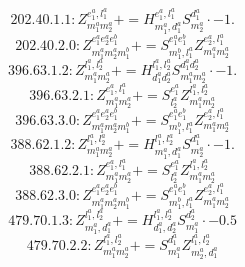 \documentclass[letterpaper,10pt,fleqn,leqno,onecolumn]{article}
\begin{document}
\begin{equation} \;\;\;\;\;\;  202.40.1.1: Z^{e_{1}^{a},l_{1}^{a}}_{m_{1}^{a}m_{2}^{a}}+=H^{e_{1}^{a},l_{1}^{a}}_{m_{1}^{a},d_{1}^{a}}S^{d_{1}^{a}}_{m_{2}^{a}}\cdot -1. \end{equation}
\begin{equation} \;\;\;\;\;\;  202.40.2.0: Z^{e_{1}^{a}e_{2}^{a}e_{1}^{b}}_{m_{1}^{a}m_{2}^{a}m_{1}^{b}}+=S^{e_{1}^{a}e_{1}^{b}}_{m_{1}^{b},l_{1}^{a}}Z^{e_{2}^{a},l_{1}^{a}}_{m_{1}^{a}m_{2}^{a}} \end{equation}
\begin{equation} \;\;\;\;\;\;  396.63.1.2: Z^{l_{1}^{a},l_{2}^{a}}_{m_{1}^{a}m_{2}^{a}}+=H^{l_{1}^{a},l_{2}^{a}}_{d_{1}^{a}d_{2}^{a}}S^{d_{1}^{a}d_{2}^{a}}_{m_{1}^{a}m_{2}^{a}}\cdot -1. \end{equation}
\begin{equation} \;\;\;\;\;\;  396.63.2.1: Z^{e_{1}^{a},l_{1}^{a}}_{m_{1}^{a}m_{2}^{a}}+=S^{e_{1}^{a}}_{l_{2}^{a}}Z^{l_{1}^{a},l_{2}^{a}}_{m_{1}^{a}m_{2}^{a}} \end{equation}
\begin{equation} \;\;\;\;\;\;  396.63.3.0: Z^{e_{1}^{a}e_{2}^{a}e_{1}^{b}}_{m_{1}^{a}m_{2}^{a}m_{1}^{b}}+=S^{e_{1}^{a}e_{1}^{b}}_{m_{1}^{b},l_{1}^{a}}Z^{e_{2}^{a},l_{1}^{a}}_{m_{1}^{a}m_{2}^{a}} \end{equation}
\begin{equation} \;\;\;\;\;\;  388.62.1.2: Z^{l_{1}^{a},l_{2}^{a}}_{m_{1}^{a}m_{2}^{a}}+=H^{l_{1}^{a},l_{2}^{a}}_{m_{1}^{a},d_{1}^{a}}S^{d_{1}^{a}}_{m_{2}^{a}}\cdot -1. \end{equation}
\begin{equation} \;\;\;\;\;\;  388.62.2.1: Z^{e_{1}^{a},l_{1}^{a}}_{m_{1}^{a}m_{2}^{a}}+=S^{e_{1}^{a}}_{l_{2}^{a}}Z^{l_{1}^{a},l_{2}^{a}}_{m_{1}^{a}m_{2}^{a}} \end{equation}
\begin{equation} \;\;\;\;\;\;  388.62.3.0: Z^{e_{1}^{a}e_{2}^{a}e_{1}^{b}}_{m_{1}^{a}m_{2}^{a}m_{1}^{b}}+=S^{e_{1}^{a}e_{1}^{b}}_{m_{1}^{b},l_{1}^{a}}Z^{e_{2}^{a},l_{1}^{a}}_{m_{1}^{a}m_{2}^{a}} \end{equation}
\begin{equation} \;\;\;\;\;\;  479.70.1.3: Z^{l_{1}^{a},l_{2}^{a}}_{m_{1}^{a},d_{1}^{a}}+=H^{l_{1}^{a},l_{2}^{a}}_{d_{1}^{a},d_{2}^{a}}S^{d_{2}^{a}}_{m_{1}^{a}}\cdot -0.5 \end{equation}
\begin{equation} \;\;\;\;\;\;  479.70.2.2: Z^{l_{1}^{a},l_{2}^{a}}_{m_{1}^{a}m_{2}^{a}}+=S^{d_{1}^{a}}_{m_{1}^{a}}Z^{l_{1}^{a},l_{2}^{a}}_{m_{2}^{a},d_{1}^{a}} \end{equation}
\end{document}
